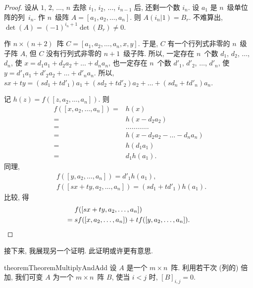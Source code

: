 \begin{proof}
    设从 \(1\), \(2\), \(\dots\), \(n\)
    去除 \(i_1\), \(i_2\), \(\dots\), \(i_{n-1}\) 后,
    还剩一个数 \(i_n\).
    设 \(a_1\) 是 \(n\)~级单位阵的列~\(i_n\).
    作 \(n\)~级阵
    \(A = [a_1, a_2, \dots, a_n]\).
    则 \(A(i_n | 1) = B_r\).
    不难算出,
    \(\det {(A)} = (-1)^{i_n + 1} \det {(B_r)} \neq 0\).

    作 \(n \times (n+2)\)~阵
    \(C = [a_1, a_2, \dots, a_n, x, y]\).
    于是, \(C\) 有一个行列式非零的 \(n\)~级子阵 \(A\),
    但 \(C\) 没有行列式非零的 \(n+1\)~级子阵.
    所以,
    一定存在 \(n\)~个数
    \(d_1\), \(d_2\), \(\dots\), \(d_n\),
    使
    \(x = d_1 a_1 + d_2 a_2 + \dots + d_n a_n\),
    也一定存在 \(n\)~个数
    \(d'_1\), \(d'_2\), \(\dots\), \(d'_n\),
    使
    \(y = d'_1 a_1 + d'_2 a_2 + \dots + d'_n a_n\).
    所以,
    \(sx + ty
    = (sd_1 + td'_1)a_1
    + (sd_2 + td'_2) a_2
    + \dots
    + (sd_n + td'_n) a_n\).

    记 \(h(z) = f ([z, a_2, \dots, a_n])\).
    则
    \begin{align*}
        f ([x, a_2, \dots, a_n])
        = {} & h(x)
        \\
        = {} & h(x - d_2 a_2)
        \\
        = {} & \dots \dots \dots \dots
        \\
        = {} & h(x - d_2 a_2 - \dots - d_n a_n)
        \\
        = {} & h(d_1 a_1)
        \\
        = {} & d_1 h(a_1).
    \end{align*}
    同理,
    \begin{align*}
         & f ([y, a_2, \dots, a_n]) = d'_1 h(a_1),
        \\
         & f ([sx + ty, a_2, \dots, a_n]) = (sd_1 + td'_1) h(a_1).
    \end{align*}
    比较, 得
    \begin{align*}
             &
        f {([sx + ty, a_2, \dots, a_n])}
        \\
        = {} &
        s f {([x, a_2, \dots, a_n])}
        +
        t f {([y, a_2, \dots, a_n])}.
        \qedhere
    \end{align*}
\end{proof}

接下来, 我展现另一个证明.
此证明或许更有意思.

\begin{restatable}{theorem}{TheoremMultiplyAndAdd}
    设 \(A\) 是一个 \(m \times n\)~阵.
    利用若干次 (列的) 倍加,
    我们可变 \(A\) 为一个 \(m \times n\)~阵 \(B\),
    使当 \(i < j\) 时,
    \([B]_{i,j} = 0\).
\end{restatable}

